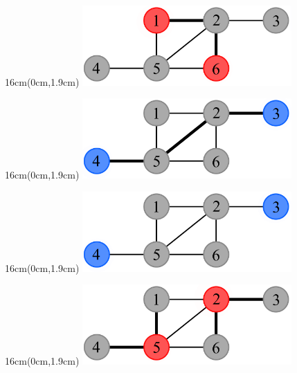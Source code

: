 \documentclass[xcolor=dvipsnames,aspectratio=1610]{beamer}
\newcommand{\exampleheight}{1.9cm}
\newcommand{\examplewidth}{16cm}
\begin{document}
\begin{frame}
     {
      \begin{textblock*}{\examplewidth}(0cm,\exampleheight) %
        \centering
        \includegraphics[width=8cm]{../figures/example-dist-1.pdf}
      \end{textblock*}
    }

     {
      \begin{textblock*}{\examplewidth}(0cm,\exampleheight) %
        \centering
        \includegraphics[width=8cm]{../figures/example-dist-2.pdf}
      \end{textblock*}
    }

     {
      \begin{textblock*}{\examplewidth}(0cm,\exampleheight) %
        \centering
        \includegraphics[width=8cm]{../figures/example-d3s.pdf}
      \end{textblock*}
    }

     {
      \begin{textblock*}{\examplewidth}(0cm,\exampleheight) %
        \centering
        \includegraphics[width=8cm]{../figures/example-dom-1.pdf}
      \end{textblock*}
    }


\end{frame}
\end{document}
